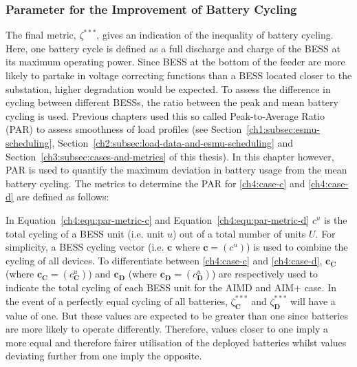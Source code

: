 \subsubsection{Parameter for the Improvement of Battery Cycling}

The final metric, $\zeta^{***}$, gives an indication of the inequality of battery cycling.
Here, one battery cycle is defined as a full discharge and charge of the BESS at its maximum operating power.
Since BESS at the bottom of the feeder are more likely to partake in voltage correcting functions than a BESS located closer to the substation, higher degradation would be expected.
To assess the difference in cycling between different BESSs, the ratio between the peak and mean battery cycling is used.
Previous chapters used this so called Peak-to-Average Ratio (PAR) to assess smoothness of load profiles (see Section~\ref{ch1:subsec:esmu-scheduling}, Section~\ref{ch2:subsec:load-data-and-esmu-scheduling} and Section~\ref{ch3:subsec:cases-and-metrics} of this thesis).
In this chapter however, PAR is used to quantify the maximum deviation in battery usage from the mean battery cycling.
The metrics to determine the PAR for \ref{ch4:case-c} and \ref{ch4:case-d} are defined as follows:




In Equation~\ref{ch4:equ:par-metric-c} and Equation~\ref{ch4:equ:par-metric-d} $c^u$ is the total cycling of a BESS unit (i.e. unit $u$) out of a total number of units $U$.
For simplicity, a BESS cycling vector (i.e. $\textbf{c}$ where $\textbf{c} = (c^u)$) is used to combine the cycling of all devices.
To differentiate between \ref{ch4:case-c} and \ref{ch4:case-d}, $\textbf{c}_\textbf{C}$ (where $\textbf{c}_\textbf{C} = (c^u_\textbf{C})$) and $\textbf{c}_\textbf{D}$ (where $\textbf{c}_\textbf{D} = (c^u_\textbf{D})$) are respectively used to indicate the total cycling of each BESS unit for the AIMD and AIM+ case.
In the event of a perfectly equal cycling of all batteries, $\zeta^{***}_\textbf{C}$ and $\zeta^{***}_\textbf{D}$ will have a value of one.
But these values are expected to be greater than one since batteries are more likely to operate differently.
Therefore, values closer to one imply a more equal and therefore fairer utilisation of the deployed batteries whilst values deviating further from one imply the opposite.
